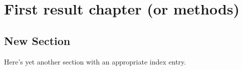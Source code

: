 
\chapter[First result chapter]{First result chapter (or methods)}
\label{chap2}

\section{New Section}
Here's yet another section with an appropriate
index entry.

